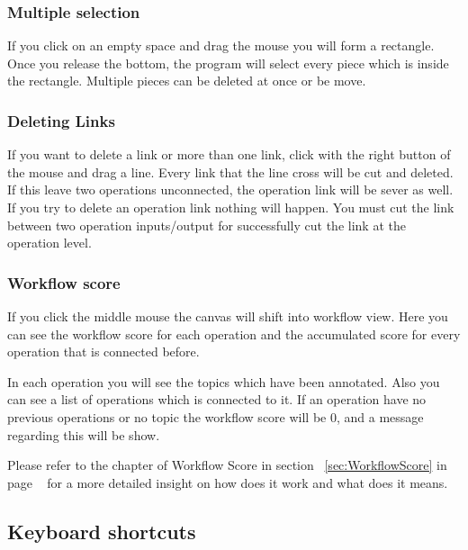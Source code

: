 \documentclass[a4paper,10pt]{article}
\begin{document}
    \subsubsection{Multiple selection}
    If you click on an empty space and drag the mouse you will form a rectangle. Once you release the bottom, the program will select every piece which is inside the rectangle. Multiple pieces can be deleted at once or be move.

    \subsubsection{Deleting Links}
    If you want to delete a link or more than one link, click with the right button of the mouse and drag a line. Every link that the line cross will be cut and deleted. If this leave two operations unconnected, the operation link will be sever as well. If you try to delete an operation link nothing will happen. You must cut the link between two operation inputs/output for successfully cut the link at the operation level.

    \subsubsection{Workflow score}
    If you click the middle mouse the canvas will shift into workflow view. Here you can see the workflow score for each operation and the accumulated score for every operation that is connected before.\vspace{3 mm}

    In each operation you will see the topics which have been annotated. Also you can see a list of operations which is connected to it. If an operation have no previous operations or no topic the workflow score will be 0, and a message regarding this will be show.\vspace{3 mm}

    Please refer to the chapter of Workflow Score in section ~\ref{sec:WorkflowScore} in page ~\pageref{sec:WorkflowScore} for a more detailed insight on how does it work and what does it means.\vspace{3 mm}

  \subsection{Keyboard shortcuts}
\end{document}
